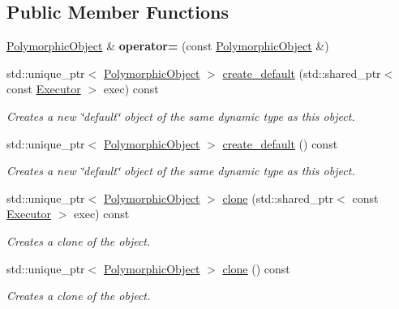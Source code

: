 \subsection*{Public Member Functions}
\begin{DoxyCompactItemize}
\item 
\mbox{\label{classgko_1_1PolymorphicObject_ab9abbed8b77c7b4b2feb2ec30dc65e47}} 
\hyperlink{classgko_1_1PolymorphicObject}{Polymorphic\+Object} \& {\bfseries operator=} (const \hyperlink{classgko_1_1PolymorphicObject}{Polymorphic\+Object} \&)
\item 
std\+::unique\+\_\+ptr$<$ \hyperlink{classgko_1_1PolymorphicObject}{Polymorphic\+Object} $>$ \hyperlink{classgko_1_1PolymorphicObject_aca2ad91eee15e667cc0e7d1444a6de47}{create\+\_\+default} (std\+::shared\+\_\+ptr$<$ const \hyperlink{classgko_1_1Executor}{Executor} $>$ exec) const
\begin{DoxyCompactList}\small\item\em Creates a new \char`\"{}default\char`\"{} object of the same dynamic type as this object. \end{DoxyCompactList}\item 
std\+::unique\+\_\+ptr$<$ \hyperlink{classgko_1_1PolymorphicObject}{Polymorphic\+Object} $>$ \hyperlink{classgko_1_1PolymorphicObject_a4f39c32375e3887fd4d7a9f02af42ca7}{create\+\_\+default} () const
\begin{DoxyCompactList}\small\item\em Creates a new \char`\"{}default\char`\"{} object of the same dynamic type as this object. \end{DoxyCompactList}\item 
std\+::unique\+\_\+ptr$<$ \hyperlink{classgko_1_1PolymorphicObject}{Polymorphic\+Object} $>$ \hyperlink{classgko_1_1PolymorphicObject_ada90b9acf2e6b3201a9b2e09ac56217f}{clone} (std\+::shared\+\_\+ptr$<$ const \hyperlink{classgko_1_1Executor}{Executor} $>$ exec) const
\begin{DoxyCompactList}\small\item\em Creates a clone of the object. \end{DoxyCompactList}\item 
std\+::unique\+\_\+ptr$<$ \hyperlink{classgko_1_1PolymorphicObject}{Polymorphic\+Object} $>$ \hyperlink{classgko_1_1PolymorphicObject_a298c488bcb1906877a3584d88713ba81}{clone} () const
\begin{DoxyCompactList}\small\item\em Creates a clone of the object. \end{DoxyCompactList}\item 

\end{DoxyCompactItemize}
